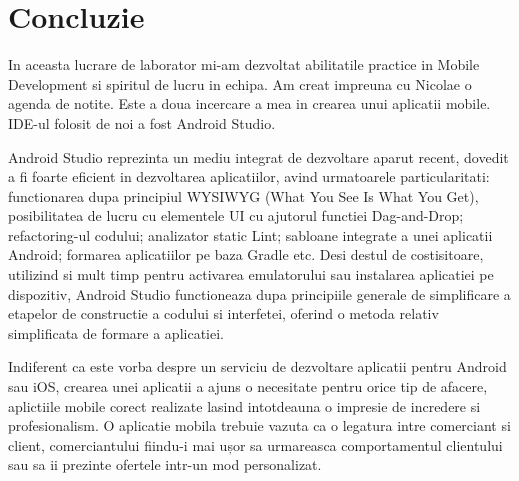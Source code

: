 \section*{Concluzie}


In aceasta lucrare de laborator mi-am dezvoltat abilitatile practice in Mobile Development si spiritul de lucru in echipa. Am creat impreuna cu Nicolae o agenda de notite. Este a doua incercare a mea in crearea unui aplicatii mobile. IDE-ul folosit de noi a fost Android Studio.

Android Studio reprezinta un mediu integrat de dezvoltare aparut recent, dovedit a fi foarte eficient in dezvoltarea aplicatiilor, avind urmatoarele particularitati: functionarea dupa principiul WYSIWYG (What You See Is What You Get), posibilitatea de lucru cu elementele UI cu ajutorul functiei Dag-and-Drop; refactoring-ul codului; analizator static Lint; sabloane integrate a unei aplicatii Android; formarea aplicatiilor pe baza Gradle etc.  Desi destul de costisitoare, utilizind si mult timp pentru activarea emulatorului sau instalarea aplicatiei pe dispozitiv, Android Studio functioneaza dupa principiile generale de simplificare a etapelor de constructie a codului si interfetei, oferind o metoda relativ simplificata de formare a aplicatiei.


Indiferent ca este vorba despre un serviciu de dezvoltare aplicatii pentru Android sau iOS, crearea unei aplicatii a ajuns o necesitate pentru orice tip de afacere, aplictiile mobile corect realizate lasind intotdeauna o impresie de incredere si profesionalism. O aplicatie mobila trebuie vazuta ca o legatura intre comerciant si client, comerciantului fiindu-i mai ușor sa urmareasca comportamentul clientului sau sa ii prezinte ofertele intr-un mod personalizat.

\clearpage
